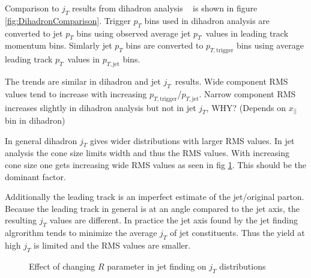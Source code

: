 Comparison to $j_T$ results from dihadron analysis ~\cite{ref} is shown in figure \ref{fig:DihadronComparison}. Trigger $p_T$ bins used in dihadron analysis are converted to jet $p_T$ bins using observed average jet $p_T$ values in leading track momentum bins. Simlarly jet $p_T$ bins are converted to $p_{T,\mathrm{trigger}}$ bins using average leading track $p_T$ values in $p_{T,\mathrm{jet}}$ bins.

The trends are similar in dihadron and jet $j_T$ results. Wide component RMS values tend to increase with increasing $p_{T,\mathrm{trigger}}$/$p_{T,\mathrm{jet}}$. Narrow component RMS increases slightly in dihadron analysis but not in jet $j_T$, WHY? (Depends on $x_{||}$ bin in dihadron)

In general dihadron $j_T$ gives wider distributions with larger RMS values. In jet analysis the cone size limits width and thus the RMS values. With increasing cone size one gets increasing wide RMS values as seen in fig \ref{fig:Rcomparison}. This should be the dominant factor.

Additionally the leading track is an imperfect estimate of the jet/original parton. Because the leading track in general is at an angle compared to the jet axis, the resulting $j_T$ values are different. In practice the jet axis found by the jet finding algrorithm tends to minimize the average $j_T$ of jet constituents. Thus the yield at high $j_T$ is limited and the RMS values are smaller.



\begin{figure}[htp]
\centering
{}
\caption[Pythia $R$ parameters $j_T$]{Effect of changing $R$ parameter in jet finding on $j_T$ distributions}
\label{fig:Rcomparison}
\end{figure}




